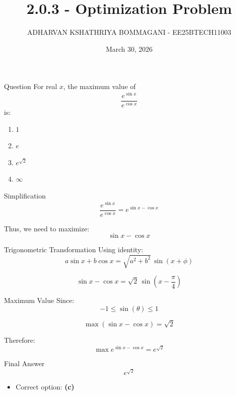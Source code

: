 \documentclass{beamer}
\title{2.0.3 - Optimization Problem}
\date{March 30, 2026}
\author{ADHARVAN KSHATHRIYA BOMMAGANI - EE25BTECH11003}
\begin{document}
\frame{\titlepage}

\begin{frame}{Question}
For real $x$, the maximum value of
\[
\frac{e^{\sin x}}{e^{\cos x}}
\]
is:

\begin{enumerate}[label=\alph*)]
    \item $1$
    \item $e$
    \item $e^{\sqrt{2}}$
    \item $\infty$
\end{enumerate}
\end{frame}

\begin{frame}{Simplification}
\[
\frac{e^{\sin x}}{e^{\cos x}} = e^{\sin x - \cos x}
\]

Thus, we need to maximize:
\[
\sin x - \cos x
\]
\end{frame}

\begin{frame}{Trigonometric Transformation}
Using identity:
\[
a\sin x + b\cos x = \sqrt{a^2 + b^2}\,\sin(x + \phi)
\]

\[
\sin x - \cos x = \sqrt{2}\,\sin\left(x - \frac{\pi}{4}\right)
\]
\end{frame}

\begin{frame}{Maximum Value}
Since:
\[
-1 \leq \sin(\theta) \leq 1
\]

\[
\max(\sin x - \cos x) = \sqrt{2}
\]

Therefore:
\[
\max e^{\sin x - \cos x} = e^{\sqrt{2}}
\]
\end{frame}

\begin{frame}{Final Answer}
\[
\boxed{e^{\sqrt{2}}}
\]

\begin{itemize}
    \item Correct option: \textbf{(c)}
\end{itemize}
\end{frame}
\end{document}

